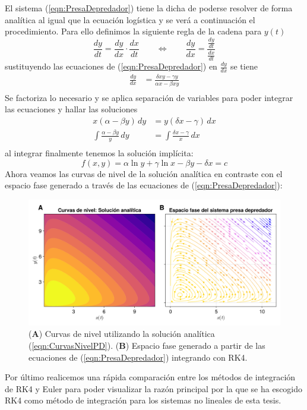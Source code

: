 El sistema (\ref{eqn:PresaDepredador}) tiene la dicha de poderse resolver de forma analítica al igual que la ecuación logística y se verá a continuación el procedimiento. Para ello definimos la siguiente regla de la cadena para $y(t)$
$$\frac{dy}{dt} = \frac{dy}{dx}\cdot\frac{dx}{dt}\qquad\Longleftrightarrow\qquad\frac{dy}{dx}=\frac{\frac{dy}{dt}}{\frac{dx}{dt}}$$
sustituyendo las ecuaciones de (\ref{eqn:PresaDepredador}) en $\frac{dy}{dx}$ se tiene
\begin{align*}
	\frac{dy}{dx}&=\frac{\delta xy-\gamma y}{\alpha x-\beta xy}  \\
\end{align*}
Se factoriza lo necesario y se aplica separación de variables para poder integrar las ecuaciones y hallar las soluciones
\begin{align*}
	x(\alpha-\beta y)\, dy &= y(\delta x-\gamma)\, dx\\
	\int \frac{\alpha-\beta y}{y}\, dy &= \int \frac{\delta x-\gamma}{x}\, dx \\
\end{align*}
al integrar finalmente tenemos la solución implícita:
\begin{equation}\label{eqn:CurvasNivelPD}
	f(x,y)=\alpha\ln y+\gamma\ln x-\beta y- \delta x=c
\end{equation}
Ahora veamos las curvas de nivel de la solución analítica en contraste con el espacio fase generado a través de las ecuaciones de (\ref{eqn:PresaDepredador}):
\begin{figure}[h!]
	\centering
	\includegraphics[scale=0.22]{../Imagenes/Curvas de nivel PD}
	\caption{(\textbf{A}) Curvas de nivel utilizando la solución analítica (\ref{eqn:CurvasNivelPD}). (\textbf{B}) Espacio fase generado a partir de las ecuaciones de (\ref{eqn:PresaDepredador}) integrando con RK4.}
	\label{fig:CurvasNivelPD}
\end{figure}
\newpage
Por último realicemos una rápida comparación entre los métodos de integración de RK4 y Euler para poder visualizar la razón principal por la que se ha escogido RK4 como método de integración para los sistemas no lineales de esta tesis.
